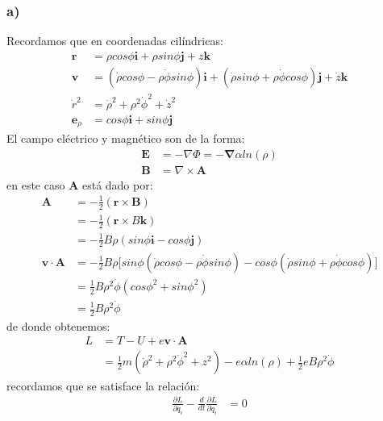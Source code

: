 \documentclass{article}
\begin{document}
\begin{tcolorbox}[breakable]
    \subsubsection*{a)}
    Recordamos que en coordenadas cilíndricas:
    \begin{align*}
        \bm{r} &= \rho cos\phi \bm{i} + \rho sin\phi\bm{j} + z\bm{k} \\
        \bm{v} 
        &=(\dot{\rho} cos\phi - \rho \dot{\phi}sin\phi) \bm{i} 
        + (\dot{\rho}sin\phi + \rho \dot{\phi}cos\phi) \bm{j} 
        + \dot{z}\bm{k} \\
        \dot{r}^2 &= \dot{\rho}^2 + \rho^2\dot{\phi}^2 + \dot{z}^2 \\ 
        \bm{e}_\rho &= cos\phi \bm{i} + sin\phi \bm{j} 
    \end{align*}
    El campo eléctrico y magnético son de la forma:
    \begin{align*}
        \bm{E} &= -\nabla \Phi = -\bm{\nabla} \alpha ln(\rho) \\ 
        \bm{B} &= \nabla \times \bm{A} 
    \end{align*}
    en este caso $\bm{A}$ está dado por:
    \begin{align*}
        \bm{A} 
        &= -\frac{1}{2}(\bm{r} \times \bm{B}) \\
        &= -\frac{1}{2}(\bm{r} \times B\bm{k}) \\
        &= -\frac{1}{2}B\rho(sin\phi \bm{i} - cos\phi \bm{j}) \\
        \bm{v} \cdot \bm{A} 
        &= -\frac{1}{2}B\rho 
        \bigg[ sin\phi (\dot{\rho} cos\phi - \rho \dot{\phi}sin\phi) 
        -cos\phi (\dot{\rho}sin\phi + \rho \dot{\phi}cos\phi) \bigg] \\
        &= \frac{1}{2}B\rho^2 \dot{\phi}(cos\phi^2 + sin\phi^2) \\
        &= \frac{1}{2}B\rho^2 \dot{\phi} 
    \end{align*}
    de donde obtenemos:
    \begin{align*}
        L 
        &= T - U + e\bm{v} \cdot \bm{A} \\
        &= \frac{1}{2}m(\dot{\rho}^2 + \rho^2\dot{\phi}^2 + z^2) - e\alpha ln(\rho) + \frac{1}{2}eB\rho^2 \dot{\phi}
    \end{align*}
    recordamos que se satisface la relación:
    \begin{align*}
        \frac{\partial L}{\partial q_i} - \frac{d}{dt}\frac{\partial L}{\partial \dot{q}_i} &= 0

\end{align*}
\end{tcolorbox}
\end{document}
